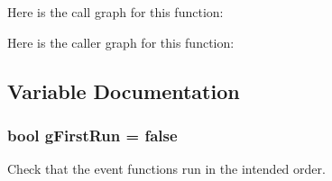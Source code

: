 Here is the call graph for this function\+:




Here is the caller graph for this function\+:




\subsection{Variable Documentation}
\subsubsection[{\texorpdfstring{g\+First\+Run}{gFirstRun}}]{\setlength{\rightskip}{0pt plus 5cm}bool g\+First\+Run = {\bf false}}\hypertarget{main-test-sync_8cc_a7f665ac99b46b322e6d18f21eace3cd7}{}\label{main-test-sync_8cc_a7f665ac99b46b322e6d18f21eace3cd7}
Check that the event functions run in the intended order. 